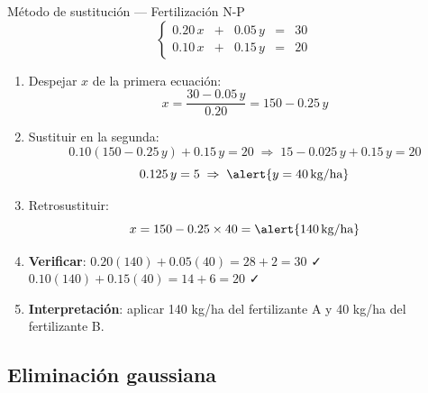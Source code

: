 \documentclass[11pt, aspectratio=169]{beamer}
\newcommand{\unidad}[1]{\,\text{#1}}
\begin{document}
\begin{frame}{Método de sustitución — Fertilización N-P}
  \[
    \left\{
    \begin{array}{rcrcr}
      0.20\,x & + & 0.05\,y & = & 30 \\[4pt]
      0.10\,x & + & 0.15\,y & = & 20
    \end{array}
    \right.
  \]

  \begin{enumerate}
    \item<1-> Despejar $x$ de la primera ecuación:
      \[ x = \frac{30 - 0.05\,y}{0.20} = 150 - 0.25\,y \]

    \item<2-> Sustituir en la segunda:
      \[ 0.10(150 - 0.25\,y) + 0.15\,y = 20
         \;\Rightarrow\; 15 - 0.025\,y + 0.15\,y = 20 \]
      \[ 0.125\,y = 5 \;\Rightarrow\; \alert{y = 40 \unidad{kg/ha}} \]

    \item<3-> Retrosustituir:
      \[ x = 150 - 0.25 \times 40 = \alert{140 \unidad{kg/ha}} \]

    \item<4-> \textbf{Verificar}: $0.20(140) + 0.05(40) = 28 + 2 = 30$ ✓ \quad
      $0.10(140) + 0.15(40) = 14 + 6 = 20$ ✓

    \item<5-> \textbf{Interpretación}: aplicar \alert{140 kg/ha} del fertilizante A
      y \alert{40 kg/ha} del fertilizante B.
  \end{enumerate}
\end{frame}

\subsection{Eliminación gaussiana}
\end{document}
